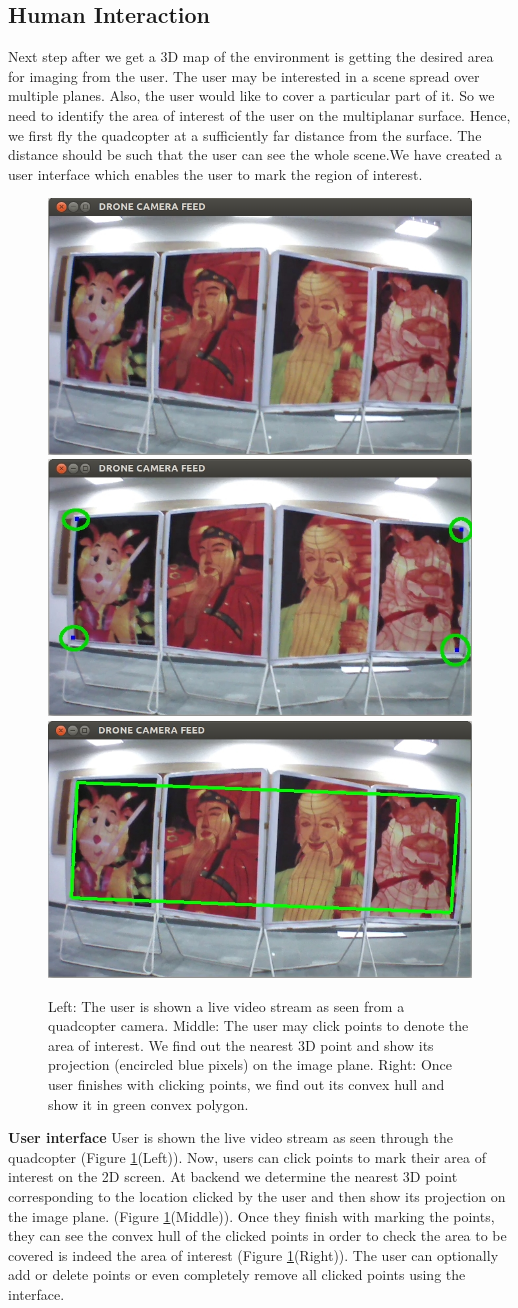 \subsection{Human Interaction}
Next step after we get a 3D map of the environment is getting the desired area for
imaging from the user. The user may be interested in a scene spread over multiple
planes. Also, the user would like to cover a particular part of it. So we need
to identify the area of interest of the user on the multiplanar surface.
Hence, we  first fly the quadcopter at a sufficiently far distance from the
surface. The distance should be such that the user can see the whole
scene.We have created a user interface which enables the user to mark the region
of interest.\\
\begin{figure}[t!]
\centering
\includegraphics[width=0.31\linewidth]{images/UI_input}
\includegraphics[width=0.31\linewidth]{images/UI_points_marked}
\includegraphics[width=0.31\linewidth]{images/UI_convexHull}
\caption[Our user interface]{Left: The user is shown a live video stream as seen
from a quadcopter camera. Middle: The user may click points to denote the area of interest. We 
find out the nearest 3D point and show its projection (encircled blue pixels) on
the image plane. Right: Once user finishes with clicking points, we find out its convex
hull and show it in green convex polygon.}
\label{fig:ui}
\end{figure}
\textbf{User interface} User is shown the live video stream as seen through
the quadcopter (Figure \ref{fig:ui}(Left)). Now, users can click points to
mark their area of interest on the 2D screen. At backend we determine the
nearest 3D point corresponding to the location clicked by the user and then show
its projection on the image plane. (Figure \ref{fig:ui}(Middle)). Once they
finish with marking the points, they can see the convex hull of the
clicked points in order to check the area to be covered is indeed the area of
interest (Figure \ref{fig:ui}(Right)). The user can optionally add or delete points
or even completely remove all clicked points using the interface.

